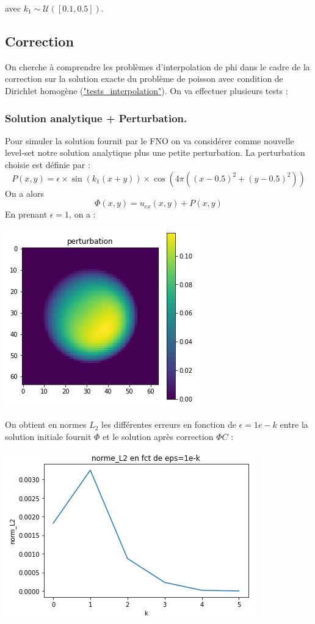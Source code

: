 avec $k_1 \sim \mathcal{U}([0.1,0.5])$.

\subsection{Correction}

On cherche à comprendre les problèmes d'interpolation de phi dans le cadre de la correction sur la solution exacte du problème de poisson avec condition de Dirichlet homogène (\href{https://colab.research.google.com/drive/17S0TrfstBv8vk6KR3uAy8gbeOcSkWPsY#scrollTo=7i8HL9-JKfEj}{"tests\_interpolation"}). On va effectuer plusieurs tests :

\subsubsection*{Solution analytique + Perturbation.}

Pour simuler la solution fournit par le FNO on va considérer comme nouvelle level-set notre solution analytique plus une petite perturbation. La perturbation choisie est définie par :
$$P(x,y)=\epsilon\times\sin(k_1(x+y))\times\cos(4\pi((x-0.5)^2+(y-0.5)^2))$$
On a alors
$$\Phi(x,y)=u_{ex}(x,y)+P(x,y)$$
En prenant $\epsilon=1$, on a :

\begin{minipage}{\linewidth}
	\centering
	\includegraphics[width=0.3\linewidth]{perturbation.png}
\end{minipage}

On obtient en normes $L_2$ les différentes erreurs en fonction de $\epsilon=1e-k$ entre la solution initiale fournit $\Phi$ et le solution après correction $\Phi C$ : 

\begin{minipage}{\linewidth}
	\centering
	\includegraphics[width=0.45\linewidth]{erreurs_perturb.png}
\end{minipage}

